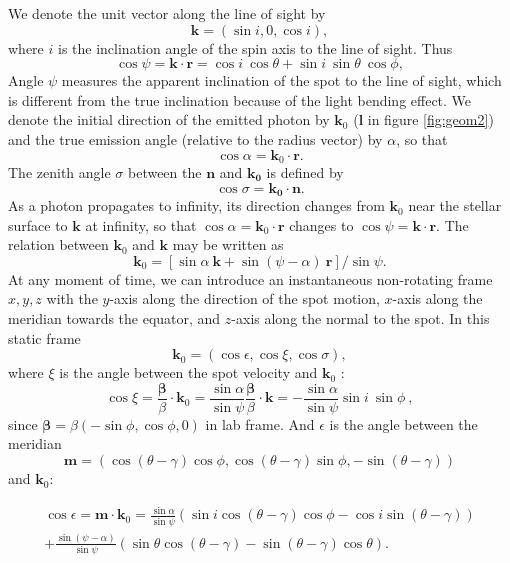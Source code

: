 \documentclass{wihuri}
\def\be{\begin{equation}}
\def\ee{\end{equation}}
\newcommand{\bmath}[1]{\boldsymbol{#1}}
\begin{document}
We denote the unit vector along the line of sight by 
\be
\bmath{k}=(\sin i, 0, \cos i), 
\ee 
where $i$ is the inclination angle of the spin axis to the line of sight. 
Thus 
\be \label{eq:psi2}
  \cos\psi=\bmath{k}\cdot \bmath{r} = \cos i\ \cos\theta+\sin i\ \sin \theta\ \cos\phi,
\ee
Angle $\psi$ measures the apparent inclination of the spot to the line of
sight, which is different from the true inclination because of
the light bending effect.
We denote the initial direction of the emitted photon by $\bmath{k}_0$ ($\bmath{l}$ in figure \ref{fig:geom2})
and the true emission angle (relative to the radius vector) by $\alpha$, so that
\be
 \cos\alpha=\bmath{k}_0 \cdot \bmath{r}.
\ee
The zenith angle $\sigma$ between the $\bmath{n}$ and $\bmath{k_{0}}$ is defined by 
\be
\cos\sigma = \bmath{k_{0}}\cdot\bmath{n}.
\ee
As a photon propagates to infinity, its direction changes from
$\bmath{k}_0$ near the stellar surface to $\bmath{k}$ at infinity,
so that $\cos\alpha=\bmath{k}_0\cdot\bmath{r}$
changes to $\cos\psi=\bmath{k}\cdot\bmath{r}$.
The relation between $\bmath{k}_0$ and $\bmath{k}$ may be written as
\be\label{eq:k02}
\bmath{k}_0=[ \sin\alpha\ \bmath{k} +\sin(\psi-\alpha)\ \bmath{r}]/\sin\psi.
\ee
At any moment of time, we can introduce an instantaneous non-rotating frame $x,y,z$ 
with the $y$-axis along the direction of the spot motion, 
$x$-axis along the meridian towards the equator, and 
$z$-axis along the normal  to the spot.
In this static frame 
\be 
\bmath{k}_0=
\left( 
\cos \epsilon,
\cos\xi, 
\cos\sigma
\right) ,
\ee 
where $\xi$ is the angle  between the spot velocity and $\bmath{k}_0$ :   
\be \label{eq:cosxi22}
\cos\xi=\frac{\bmath{\beta}}{\beta} \cdot \bmath{k}_0
=\frac{\sin\alpha}{\sin\psi} \frac{\bmath{\beta}}{\beta} \cdot \bmath{k}=
- \frac{\sin\alpha}{\sin\psi}\sin i\ \sin\phi\ ,
\ee
since $\bmath{\beta} = \beta(-\sin\phi,\cos\phi,0)$ in lab frame. And $\epsilon$ is the angle between the meridian 
\be
 \bmath{m} = (\cos(\theta - \gamma)\cos \phi ,\cos (\theta -\gamma)\sin \phi, -\sin (\theta -\gamma))
\ee
and $\bmath{k}_0$: 

\be \label{eq:kx-comp}
\begin{split}
\cos\epsilon= \bmath{m} \cdot \bmath{k}_0
=\frac{\sin\alpha}{\sin\psi} (\sin i \cos(\theta -\gamma)\cos \phi -\cos i \sin (\theta -\gamma)) \\ + \frac{\sin (\psi - \alpha)}{\sin \psi}(\sin \theta \cos (\theta -\gamma)-\sin (\theta -\gamma)\cos \theta).
\end{split}
\ee
\end{document}
